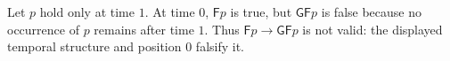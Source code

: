 \begin{example}
Let \(p\) hold only at time \(1\).  At time \(0\), \(\mathsf Fp\) is true, but
\(\mathsf G\mathsf Fp\) is false because no occurrence of \(p\) remains after
time \(1\).  Thus \(\mathsf Fp\to\mathsf G\mathsf Fp\) is not valid:
the displayed temporal structure and position \(0\) falsify it.
\end{example}

